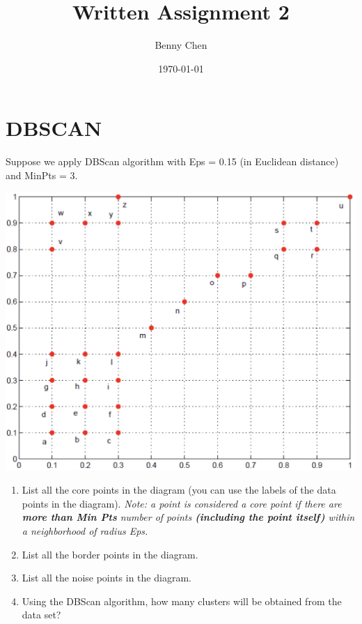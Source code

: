 \documentclass{article}
\title{Written Assignment 2}
\author{Benny Chen}
\date{\today}
\begin{document}
\maketitle

\section{DBSCAN}

Suppose we apply DBScan algorithm with Eps = 0.15 (in Euclidean distance) and MinPts = 3.

\begin{center}
    \includegraphics[width=\textwidth]{./images/Q1image.png}
\end{center}  

\begin{enumerate}[label=(\alph*)]
    \item List all the core points in the diagram (you can use the labels of the data points in the diagram). \textit{Note: a point is considered a core point if there are \textbf{more than Min Pts} number of points \textbf{(including the point itself)} within a neighborhood of radius Eps.}
    \item List all the border points in the diagram.
    \item List all the noise points in the diagram.
    \item Using the DBScan algorithm, how many clusters will be obtained from the data set?
\end{enumerate}
\end{document}
